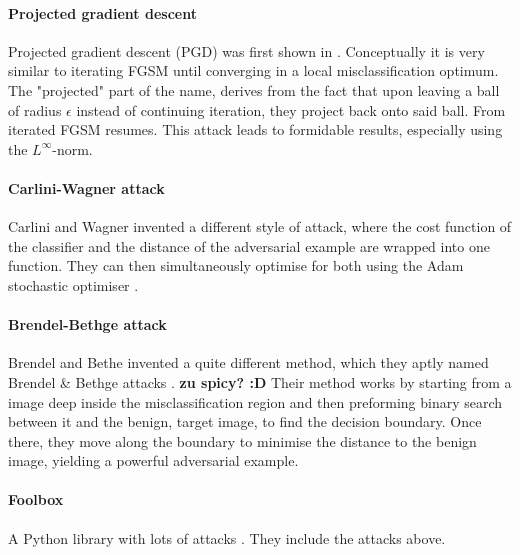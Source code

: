 \documentclass{article}
\begin{document}
\paragraph{Projected gradient descent}
Projected gradient descent (PGD) was first shown in \cite{madry2017towards}. Conceptually it is very similar to iterating FGSM until converging in a local misclassification optimum. The "projected" part of the name, derives from the fact that upon leaving a ball of radius $\epsilon$ instead of continuing iteration, they project back onto said ball. From iterated FGSM resumes.
This attack leads to formidable results, especially using the $L^\infty$-norm.



\paragraph{Carlini-Wagner attack}

Carlini and Wagner \cite{carlini2017towards} invented a different style of attack, where the cost function of the classifier and the distance of the adversarial example are wrapped into one function. They can then simultaneously optimise for both using the Adam stochastic optimiser \cite{kingma2017adam}.

\paragraph{Brendel-Bethge attack}

Brendel and Bethe invented a quite different method, which they aptly named Brendel \& Bethge attacks \cite{brendel2019accurate}. \textbf{zu spicy? :D}
Their method works by starting from a image deep inside the misclassification region and then preforming binary search between it and the benign, target image, to find the decision boundary. Once there, they move along the boundary to minimise the distance to the benign image, yielding a powerful adversarial example.

\paragraph{Foolbox}
A Python library with lots of attacks \cite{rauber2017foolbox}. They include the attacks above.
\end{document}
